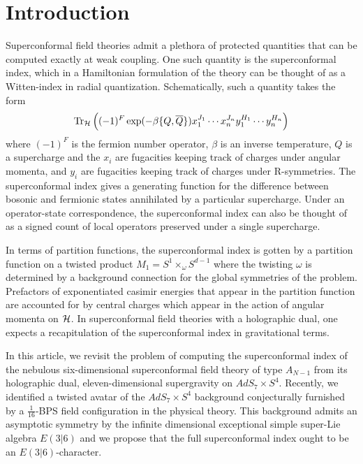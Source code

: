 %
%

%

\section{Introduction}
Superconformal field theories admit a plethora of protected quantities that can be computed exactly at weak coupling. One such quantity is the superconformal index, which in a Hamiltonian formulation of the theory can be thought of as a Witten-index in radial quantization. Schematically, such a quantity takes the form \[\operatorname{Tr} _{\mathcal{H}} \left ( (-1)^F \exp (-\beta \{ Q, \overline Q\} ) x_1^{J_1}\cdots x_n^{J_n}y_1^{H_1}\cdots y_n^{H_n} \right )\] where $(-1)^F$ is the fermion number operator, $\beta$ is an inverse temperature, $Q$ is a supercharge and the $x_i$ are fugacities keeping track of charges under angular momenta, and $y_i$ are fugacities keeping track of charges under R-symmetries. The superconformal index gives a generating function for the difference between bosonic and fermionic states annihilated by a particular supercharge. Under an operator-state correspondence, the superconformal index can also be thought of as a signed count of local operators preserved under a single supercharge. 

In terms of partition functions, the superconformal index is gotten by a partition function on a twisted product $M_{1} = S^{1}\times_\omega S^{d-1}$ where the twisting $\omega$ is determined by a background connection for the global symmetries of the problem. Prefactors of exponentiated casimir energies that appear in the partition function are accounted for by central charges which appear in the action of angular momenta on $\mathcal{H}$. In superconformal field theories with a holographic dual, one expects a recapitulation of the superconformal index in gravitational terms. 

In this article, we revisit the problem of computing the superconformal index of the nebulous six-dimensional superconformal field theory of type $A_{N-1}$ from its holographic dual, eleven-dimensional supergravity on $AdS_7\times S^4$. Recently, we identified a twisted avatar of the $AdS_7\times S^4$ background conjecturally furnished by a $\frac{1}{16}$-BPS field configuration in the physical theory. This background admits an asymptotic symmetry by the infinite dimensional exceptional simple super-Lie algebra $E(3|6)$ and we propose that the full superconformal index ought to be an $E(3|6)$-character.

